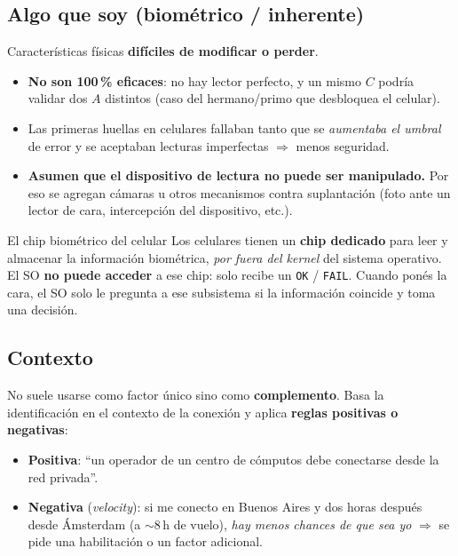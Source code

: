 \documentclass[11pt,a4paper]{article}
\begin{document}
\subsection{Algo que soy (biométrico / inherente)}
Características físicas \textbf{difíciles de modificar o perder}.
\begin{itemize}[leftmargin=1.4em,itemsep=1pt]
  \item \textbf{No son 100\,\% eficaces}: no hay lector perfecto, y un mismo $C$ podría
        validar dos $A$ distintos (caso del hermano/primo que desbloquea el celular).
  \item Las primeras huellas en celulares fallaban tanto que se \emph{aumentaba el umbral}
        de error y se aceptaban lecturas imperfectas $\Rightarrow$ menos seguridad.
  \item \textbf{Asumen que el dispositivo de lectura no puede ser manipulado.} Por eso se
        agregan cámaras u otros mecanismos contra suplantación (foto ante un lector de cara,
        intercepción del dispositivo, etc.).
\end{itemize}

\begin{practbox}{El chip biométrico del celular}
Los celulares tienen un \textbf{chip dedicado} para leer y almacenar la información
biométrica, \emph{por fuera del kernel} del sistema operativo. El SO \textbf{no puede
acceder} a ese chip: solo recibe un \texttt{OK} / \texttt{FAIL}. Cuando ponés la cara, el SO
solo le pregunta a ese subsistema si la información coincide y toma una decisión.
\end{practbox}

\subsection{Contexto}
No suele usarse como factor único sino como \textbf{complemento}. Basa la identificación en
el contexto de la conexión y aplica \textbf{reglas positivas o negativas}:
\begin{itemize}[leftmargin=1.4em,itemsep=1pt]
  \item \textbf{Positiva}: ``un operador de un centro de cómputos debe conectarse desde la
        red privada''.
  \item \textbf{Negativa} (\emph{velocity}): si me conecto en Buenos Aires y dos horas después
        desde Ámsterdam (a $\sim$8\,h de vuelo), \emph{hay menos chances de que sea yo}
        $\Rightarrow$ se pide una habilitación o un factor adicional.
\end{itemize}
\end{document}
